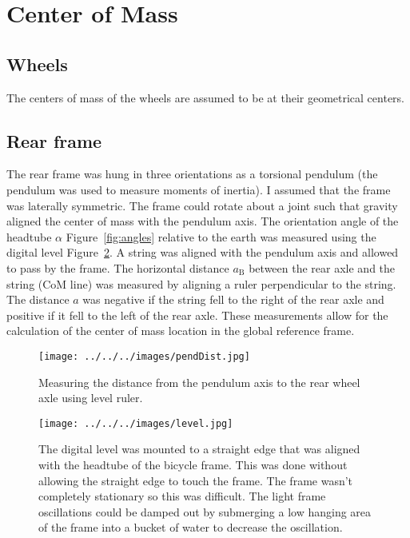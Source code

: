 \documentclass{bmd2010p}
\begin{document}
\section{Center of Mass}
\subsection{Wheels}
The centers of mass of the wheels are assumed to be at their geometrical centers.
\subsection{Rear frame}
The rear frame was hung in three orientations as a torsional pendulum (the
pendulum was used to measure moments of inertia). I
assumed that the frame was laterally symmetric. The
frame could rotate about a joint such that gravity aligned the center of mass
with the pendulum axis. The orientation angle of the headtube $\alpha$
Figure~\ref{fig:angles} relative
to the earth was
measured using the digital level Figure~\ref{fig:level}. A string was aligned with the pendulum axis
and allowed to pass by the frame. The horizontal distance $a_\mathrm{B}$ between the rear
axle and the string (CoM line) was measured by aligning a ruler perpendicular to
the string. The distance $a$ was negative if the string fell to the right of
the rear axle and positive if it fell to the left of the rear axle. These
measurements allow for the calculation of the center of mass location in the
global reference frame.
\begin{figure}[htbp]
    \begin{center}
        \texttt{[image: ../../../images/pendDist.jpg]}
    \end{center}
    \caption{Measuring the distance from the pendulum axis to the rear wheel
    axle using level ruler.}
    \label{fig:PendDist}
\end{figure}
\begin{figure}[tb]
	\begin{center}
		\texttt{[image: ../../../images/level.jpg]}
	\end{center}
	\caption{The digital level was mounted to a straight edge that was aligned
    with the headtube of the bicycle frame. This was done without allowing the
    straight edge to touch the frame. The frame wasn't completely stationary so
    this was difficult. The light frame oscillations could be damped out by
    submerging a low hanging area of the frame into a bucket of water to
    decrease the oscillation.}
	\label{fig:level}
\end{figure}
\end{document}

